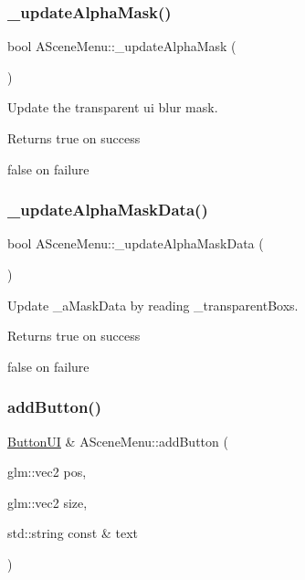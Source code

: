 \subsubsection{\texorpdfstring{\+\_\+update\+Alpha\+Mask()}{\_updateAlphaMask()}}
{\footnotesize\ttfamily bool A\+Scene\+Menu\+::\+\_\+update\+Alpha\+Mask (\begin{DoxyParamCaption}{ }\end{DoxyParamCaption})\hspace{0.3cm}{\ttfamily [protected]}}



Update the transparent ui blur mask. 

\begin{DoxyReturn}{Returns}
true on success 

false on failure 
\end{DoxyReturn}
\mbox{\label{class_a_scene_menu_ad1329cc6ba1992e44b80279a03a11ea9}} 
\subsubsection{\texorpdfstring{\+\_\+update\+Alpha\+Mask\+Data()}{\_updateAlphaMaskData()}}
{\footnotesize\ttfamily bool A\+Scene\+Menu\+::\+\_\+update\+Alpha\+Mask\+Data (\begin{DoxyParamCaption}{ }\end{DoxyParamCaption})\hspace{0.3cm}{\ttfamily [protected]}}



Update \+\_\+a\+Mask\+Data by reading \+\_\+transparent\+Boxs. 

\begin{DoxyReturn}{Returns}
true on success 

false on failure 
\end{DoxyReturn}
\mbox{\label{class_a_scene_menu_a20622fb8d15a21b407d4832e66162cbb}} 
\subsubsection{\texorpdfstring{add\+Button()}{addButton()}}
{\footnotesize\ttfamily \hyperlink{class_button_u_i}{Button\+UI} \& A\+Scene\+Menu\+::add\+Button (\begin{DoxyParamCaption}\item[{glm\+::vec2}]{pos,  }\item[{glm\+::vec2}]{size,  }\item[{std\+::string const \&}]{text }\end{DoxyParamCaption})}



